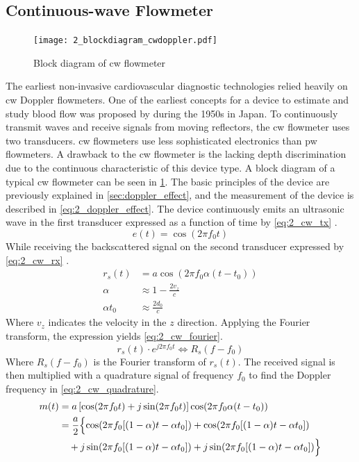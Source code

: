 \subsection{Continuous-wave Flowmeter}
\begin{figure}[ht]
	\centering
	\texttt{[image: 2\_blockdiagram\_cwdoppler.pdf]}
	\caption[Block diagram of continuous-wave flowmeter]{Block diagram of \gls{cw} flowmeter \cite{JensenUltrasoundBook}}
	\label{fig:2_devices_cw}
\end{figure}
The earliest non-invasive cardiovascular diagnostic technologies relied heavily on \gls{cw} Doppler flowmeters. One of the earliest concepts for a device to estimate and study blood flow was proposed by \citeauthor{Satomura_CW}\cite{Satomura_CW} during the 1950s in Japan. To continuously transmit waves and receive signals from moving reflectors, the \gls{cw} flowmeter uses two transducers. \gls{cw} flowmeters use less sophisticated electronics than \gls{pw} flowmeters. A drawback to the \gls{cw} flowmeter is the lacking depth discrimination due to the continuous characteristic of this device type. A block diagram of a typical \gls{cw} flowmeter can be seen in \cref{fig:2_devices_cw}. The basic principles of the device are previously explained in \cref{sec:doppler_effect}, and the measurement of the device is described in \cref{eq:2_doppler_effect}. The device continuously emits an ultrasonic wave in the first transducer expressed as a function of time by \cref{eq:2_cw_tx} \cite{JensenUltrasoundBook}.
\begin{equation} \label{eq:2_cw_tx}
	e(t) = \cos (2\pi f_{0} t)
\end{equation}
While receiving the backscattered signal on the second transducer expressed by \cref{eq:2_cw_rx} \cite{JensenUltrasoundBook}.
\begin{align} \label{eq:2_cw_rx}
	r_{s}(t) &= a \cos \left( 2\pi f_{0} \alpha (t-t_{0}) \right) \\
	\alpha &\approx 1 - \frac{2 v_{z}}{c} \\
	\alpha t_{0} &\approx \frac{2 d_{0}}{c}
\end{align}
Where $v_{z}$ indicates the velocity in the $z$ direction. Applying the Fourier transform, the expression yields \cref{eq:2_cw_fourier}.
\begin{equation} \label{eq:2_cw_fourier}
	r_{s}(t)\cdot e^{j2\pi f_{0} t} \Longleftrightarrow R_{s}(f-f_{0})
\end{equation}
Where $R_{s}(f-f_{0})$ is the Fourier transform of $r_{s}(t)$. The received signal is then multiplied with a quadrature signal of frequency $f_{0}$ to find the Doppler frequency in \cref{eq:2_cw_quadrature}.
\begin{align} \label{eq:2_cw_quadrature}
	m(t) &= a \left[ \cos(2\pi f_{0} t) + j\sin (2\pi f_{0} t) \right] \cos (2\pi f_{0} \alpha (t-t_{0})) \\
	&= \frac{a}{2} \Bigl\{ \cos (2\pi f_{0} [ (1-\alpha) t- \alpha t_{0} ]) + \cos (2\pi f_{0} [ (1-\alpha) t- \alpha t_{0} ]) \\
	&\quad + j \sin (2\pi f_{0} [ (1-\alpha) t- \alpha t_{0} ]) + j \sin (2\pi f_{0} [(1-\alpha) t- \alpha t_{0} ]) \Bigr\} \nonumber
\end{align}

